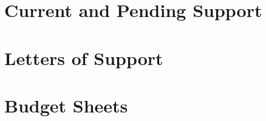 \documentclass[12pt]{article}
\begin{document}
\newpage

\section{Current and Pending Support}
\label{sec:current_and_pending}

\newpage
\addtocounter{page}{13}
\section{Letters of Support}
\label{sec:lettersofsupport}

\newpage
\addtocounter{page}{3}



\newpage

\section{Budget Sheets}


\end{document}
